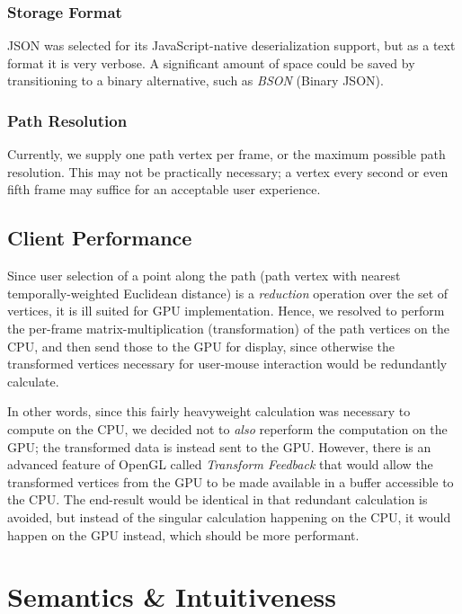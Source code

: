 \subsubsection{Storage Format}
JSON was selected for its JavaScript-native deserialization support, but as a text format it is very verbose. A significant amount of space could be saved by transitioning to a binary alternative, such as \emph{BSON} (Binary JSON).\cite{bson}

\subsubsection{Path Resolution}
    Currently, we supply one path vertex per frame, or the maximum possible path resolution. This may not be practically necessary; a vertex every second or even fifth frame may suffice for an acceptable user experience.


\subsection{Client Performance}
Since user selection of a point along the path (path vertex with nearest temporally-weighted Euclidean distance) is a \emph{reduction}\cite{reduction} operation over the set of vertices, it is ill suited for GPU implementation. Hence, we resolved to perform the per-frame matrix-multiplication (transformation) of the path vertices on the CPU, and then send those to the GPU for display, since otherwise the transformed vertices necessary for user-mouse interaction would be redundantly calculate.\par
In other words, since this fairly heavyweight calculation was necessary to compute on the CPU, we decided not to \emph{also} reperform the computation on the GPU; the transformed data is instead sent to the GPU. However, there is an advanced feature of OpenGL called \emph{Transform Feedback} that would allow the transformed vertices from the GPU to be made available in a buffer accessible to the CPU. The end-result would be identical in that redundant calculation is avoided, but instead of the singular calculation happening on the CPU, it would happen on the GPU instead, which should be more performant.



\section{Semantics \& Intuitiveness}

